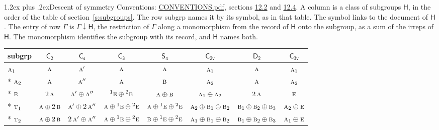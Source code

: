 \documentclass[10pt,a4paper]{article}
\makeatletter
\renewcommand\section{\@startsection{section}{1}{\z@}{-3ex plus -1ex minus -.2ex}%
  {1.2ex plus .2ex}{\normalfont\large\sffamily\bfseries\color{parttitle}}}
\numberwithin{equation}{section}
\newcommand{\grp}[1]{\mathsf{#1}}
\newcommand{\irr}[1]{\text{\normalfont\scshape #1}}
\newcommand{\conjpair}[1]{{}^{#1}}
\newcommand{\restr}[2]{#1\!\downarrow#2}
\makeatother
\begin{document}
\section{Descent of symmetry}\label{s:subduction}
Conventions: \href{../../CONVENTIONS.pdf}{CONVENTIONS.pdf}, sections \href{../../CONVENTIONS.pdf\#conv.12.2}{12.2} and \href{../../CONVENTIONS.pdf\#conv.12.4}{12.4}.
A column is a class of subgroups $\grp{H}$, in the order of the table of section~\ref{s:subgroups}. The row subgrp names it by its symbol, as in that table. The symbol links to the document of $\grp{H}$. The entry of row $\Gamma$ is $\restr{\Gamma}{\grp{H}}$, the restriction of $\Gamma$ along a monomorphism from the record of $\grp{H}$ onto the subgroup, as a sum of the irreps of $\grp{H}$. The monomorphism identifies the subgroup with its record, and $\grp{H}$ names both.
{\small\begin{longtable}{@{}lccccccc@{}}\toprule
subgrp & \href{C2.pdf}{$\grp{C_{2}}$} & \href{C1v.pdf}{$\grp{C_{s}}$} & \href{C3.pdf}{$\grp{C_{3}}$} & \href{S4.pdf}{$\grp{S_{4}}$} & \href{C2v.pdf}{$\grp{C_{2v}}$} & \href{D2.pdf}{$\grp{D_{2}}$} & \href{C3v.pdf}{$\grp{C_{3v}}$}\\\midrule\endhead
\bottomrule\endfoot\endlastfoot
$\irr{a}_{1}$ & $\irr{a}$ & $\irr{a}'$ & $\irr{a}$ & $\irr{a}$ & $\irr{a}_{1}$ & $\irr{a}$ & $\irr{a}_{1}$\\*
$\irr{a}_{2}$ & $\irr{a}$ & $\irr{a}''$ & $\irr{a}$ & $\irr{b}$ & $\irr{a}_{2}$ & $\irr{a}$ & $\irr{a}_{2}$\\*
$\irr{e}$ & $2\,\irr{a}$ & $\irr{a}'\oplus \irr{a}''$ & $\conjpair{1}\irr{e}\oplus \conjpair{2}\irr{e}$ & $\irr{a}\oplus \irr{b}$ & $\irr{a}_{1}\oplus \irr{a}_{2}$ & $2\,\irr{a}$ & $\irr{e}$\\*
$\irr{t}_{1}$ & $\irr{a}\oplus 2\,\irr{b}$ & $\irr{a}'\oplus 2\,\irr{a}''$ & $\irr{a}\oplus \conjpair{1}\irr{e}\oplus \conjpair{2}\irr{e}$ & $\irr{a}\oplus \conjpair{1}\irr{e}\oplus \conjpair{2}\irr{e}$ & $\irr{a}_{2}\oplus \irr{b}_{1}\oplus \irr{b}_{2}$ & $\irr{b}_{1}\oplus \irr{b}_{2}\oplus \irr{b}_{3}$ & $\irr{a}_{2}\oplus \irr{e}$\\*
$\irr{t}_{2}$ & $\irr{a}\oplus 2\,\irr{b}$ & $2\,\irr{a}'\oplus \irr{a}''$ & $\irr{a}\oplus \conjpair{1}\irr{e}\oplus \conjpair{2}\irr{e}$ & $\irr{b}\oplus \conjpair{1}\irr{e}\oplus \conjpair{2}\irr{e}$ & $\irr{a}_{1}\oplus \irr{b}_{1}\oplus \irr{b}_{2}$ & $\irr{b}_{1}\oplus \irr{b}_{2}\oplus \irr{b}_{3}$ & $\irr{a}_{1}\oplus \irr{e}$\\
\bottomrule\end{longtable}}
\end{document}
